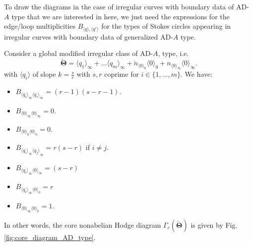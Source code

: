 \documentclass[11pt,a4paper]{amsart}
\numberwithin{equation}{section}
\newcommand{\cir}[1]{\langle #1 \rangle}
\begin{document}
To draw the diagrams in the case of irregular curves with boundary data of AD-$A$ type that we are interested in here, we just need the expressions for the edge/loop multiplicities $B_{\cir{q}, \cir{q'}}$ for the types of Stokes circles appearing in irregular curves with boundary data of generalized AD-$A$ type.

\begin{lemma}
Consider a global modified irregular class of AD-$A$, type, i.e.
\[
\bm{\breve\Theta}=\cir{q_1}_\infty+\dots \cir{q_m}_\infty+ \breve n_{\cir{0}_0} \cir{0}_0+ n_{\cir{0}_\infty}\cir{0}_\infty.
\]
with $\cir{q_i}$ of slope $k=\frac{s}{r}$ with $s,r$ coprime for $i\in \{1, \dots, m\}$. We have:
\begin{itemize}
\item $B_{{\cir{q_i}}_\infty {\cir{q_i}}_\infty}=(r-1)(s-r-1)$.
\item $B_{{\cir{0}}_\infty {\cir{0}}_\infty}=0$.
\item $B_{{\cir{0}}_0 {\cir{0}}_0}=0$.
\item $B_{{\cir{q_i}}_\infty {\cir{q_j}}_\infty}=r(s-r)$ if $i\neq j$.
\item $B_{{\cir{q_i}}_\infty {\cir{0}}_\infty}=(s-r)$
\item $B_{{\cir{q_i}}_\infty {\cir{0}}_0}=r$
\item $B_{{\cir{0}}_\infty {\cir{0}}_0}=1$.
\end{itemize}
In other words, the core nonabelian Hodge diagram $\Gamma_c(\bm{\breve\Theta})$ is given by Fig. \ref{fig:core_diagram_AD_type}.
\end{lemma}
\end{document}

